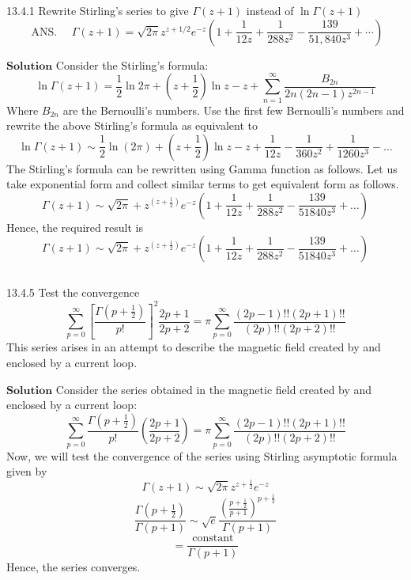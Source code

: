 


\begin{mybox}{13.4.1}
Rewrite Stirling's series to give $\Gamma(z+1)$ instead of $\ln \Gamma(z+1)$
$$
\text { ANS. } \quad \Gamma(z+1)=\sqrt{2 \pi} z^{z+1 / 2} e^{-z}\left(1+\frac{1}{12 z}+\frac{1}{288 z^{2}}-\frac{139}{51,840 z^{3}}+\cdots\right)
$$
\end{mybox}
$\boxed{\textbf{Solution}}$ Consider the Stirling's formula: 
$$\ln \Gamma(z+1)=\frac{1}{2} \ln 2 \pi+\left(z+\frac{1}{2}\right) \ln z-z+\sum_{n=1}^{\infty} \frac{B_{2 n}}{2 n(2 n-1) z^{2 n-1}}$$
Where $B_{2 n}$ are the Bernoulli's numbers. Use the first few Bernoulli's numbers and rewrite the above Stirling's formula as equivalent to
$$\ln \Gamma(z+1) \sim \frac{1}{2} \ln (2 \pi)+\left(z+\frac{1}{2}\right) \ln z-z+\frac{1}{12 z}-\frac{1}{360 z^{2}}+\frac{1}{1260 z^{3}}-\ldots$$
The Stirling's formula can be rewritten using Gamma function as follows.
Let us take exponential form and collect similar terms to get equivalent form as follows.
$$
\Gamma(z+1) \sim \sqrt{2 \pi}+z^{\left(z+\frac{1}{2}\right)} e^{-z}\left(1+\frac{1}{12 z}+\frac{1}{288 z^{2}}-\frac{139}{51840 z^{3}}+\ldots\right)
$$
Hence, the required result is $$\Gamma(z+1) \sim \sqrt{2 \pi}+z^{\left(z+\frac{1}{2}\right)} e^{-z}\left(1+\frac{1}{12 z}+\frac{1}{288 z^{2}}-\frac{139}{51840 z^{3}}+\ldots\right)$$

$$$$


\begin{mybox}{13.4.5}
Test the convergence
$$
\sum_{p=0}^{\infty}\left[\frac{\Gamma\left(p+\frac{1}{2}\right)}{p !}\right]^{2} \frac{2 p+1}{2 p+2}=\pi \sum_{p=0}^{\infty} \frac{(2 p-1) ! !(2 p+1) ! !}{(2 p) ! !(2 p+2) ! !}
$$
This series arises in an attempt to describe the magnetic field created by and enclosed by a current loop.
\end{mybox}
$\boxed{\textbf{Solution}}$ Consider the series obtained in the magnetic field created by and enclosed by a current loop:
$$
\sum_{p=0}^{\infty} \frac{\Gamma\left(p+\frac{1}{2}\right)}{p !}\left(\frac{2 p+1}{2 p+2}\right)=\pi \sum_{p=0}^{\infty} \frac{(2 p-1) ! !(2 p+1) ! !}{(2 p) ! !(2 p+2) ! !}
$$
Now, we will test the convergence of the series using Stirling asymptotic formula given by
$$
\Gamma(z+1) \sim \sqrt{2 \pi} z^{z+\frac{1}{2}} e^{-z}
$$
$$
\frac{\Gamma\left(p+\frac{1}{2}\right)}{\Gamma(p+1)} \sim \sqrt{e} \frac{\left(\frac{p+\frac{1}{2}}{p+1}\right)^{p+\frac{1}{2}}}{\Gamma(p+1)}
$$
$$
=\frac{\text { constant }}{\Gamma(p+1)}
$$
Hence, the series converges.

\newpage



